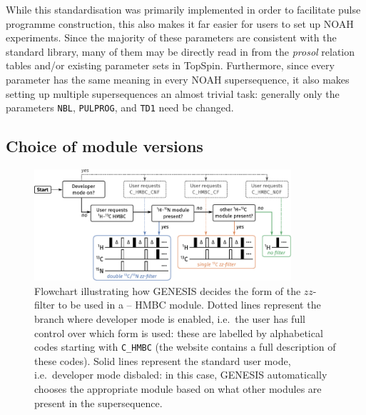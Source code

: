 \documentclass[a4paper,11pt]{article}
\newcommand{\proton}{\ch{^{1}H}}
\newcommand{\carbon}{\ch{^{13}C}}
\newcommand{\HC}{\proton{}--\carbon{}}
\begin{document}
\begin{refsection}
While this standardisation was primarily implemented in order to facilitate pulse programme construction, this also makes it far easier for users to set up NOAH experiments.
Since the majority of these parameters are consistent with the standard library, many of them may be directly read in from the \textit{prosol} relation tables and/or existing parameter sets in TopSpin.
Furthermore, since every parameter has the same meaning in every NOAH supersequence, it also makes setting up multiple supersequences an almost trivial task: generally only the parameters \texttt{NBL}, \texttt{PULPROG}, and \texttt{TD1} need be changed.


\subsection{Choice of module versions}

\begin{figure}[ht]
    \centering
    \includegraphics[width=0.85\textwidth]{flowchart.pdf}
    \caption{
        Flowchart illustrating how GENESIS decides the form of the \(zz\)-filter to be used in a \HC{} HMBC module.
        Dotted lines represent the branch where developer mode is enabled, i.e.\ the user has full control over which form is used: these are labelled by alphabetical codes starting with \texttt{C\_HMBC} (the website contains a full description of these codes).
        Solid lines represent the standard user mode, i.e.\ developer mode disbaled: in this case, GENESIS automatically chooses the appropriate module based on what other modules are present in the supersequence.
    }
    \label{fig:flowchart}
\end{figure}


\end{refsection}
\end{document}
